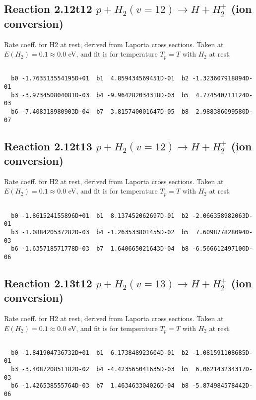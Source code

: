\documentclass[12pt,dvipdfmx]{article}
\begin{document}
\newpage
\subsection{
Reaction 2.12t12
$ p + H_2(v=12) \rightarrow H + H_2^+$ (ion conversion)
}
Rate coeff. for H2 at rest, derived from Laporta cross sections.
Taken at $E(H_2) = 0.1 \approx 0.0$ eV,  and fit is for temperature $T_p=T$ with $H_2$ at rest.

\begin{small}\begin{verbatim}

  b0 -1.763513554195D+01  b1  4.859434569451D-01  b2 -1.323607918894D-01
  b3 -3.973450804081D-03  b4 -9.964282034318D-03  b5  4.774540711124D-03
  b6 -7.408318980903D-04  b7  3.815740001647D-05  b8  2.988386099580D-07

\end{verbatim}\end{small}

\newpage
\subsection{
Reaction 2.12t13
$ p + H_2(v=12) \rightarrow H + H_2^+$ (ion conversion)
}
Rate coeff. for H2 at rest, derived from Laporta cross sections.
Taken at $E(H_2) = 0.1 \approx 0.0$ eV,  and fit is for temperature $T_p=T$ with $H_2$ at rest.

\begin{small}\begin{verbatim}

  b0 -1.861524155896D+01  b1  8.137452062697D-01  b2 -2.066358982063D-01
  b3 -1.088420537282D-03  b4 -1.263533801455D-02  b5  7.609877828094D-03
  b6 -1.635718571778D-03  b7  1.640665021643D-04  b8 -6.566612497100D-06

\end{verbatim}\end{small}

\newpage
\subsection{
Reaction 2.13t12
$ p + H_2(v=13) \rightarrow H + H_2^+$ (ion conversion)
}
Rate coeff. for H2 at rest, derived from Laporta cross sections.
Taken at $E(H_2) = 0.1 \approx 0.0$ eV,  and fit is for temperature $T_p=T$ with $H_2$ at rest.

\begin{small}\begin{verbatim}

  b0 -1.841904736732D+01  b1  6.173848923604D-01  b2 -1.081591108685D-01
  b3 -3.408720851182D-02  b4 -4.423565041635D-03  b5  6.062143234317D-03
  b6 -1.426538555764D-03  b7  1.463463304026D-04  b8 -5.874984578442D-06

\end{verbatim}\end{small}
\end{document}
